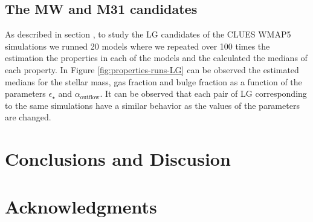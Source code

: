 \documentclass[usenatbib]{mn2e}
\begin{document}
\subsection{The MW and M31 candidates}
As described in section \label{sec:modeling-lg}, to study the LG candidates of the CLUES WMAP5 simulations we runned 20 models where we repeated over 100 times 
the estimation the properties in each of the models and the calculated the medians of each property. In Figure \ref{fig:properties-runs-LG} can be observed
the estimated medians for the stellar mass, gas fraction and bulge fraction as a function of the parameters $\epsilon_{\star}$ and $\alpha_{\text{outflow}}$.
It can be observed that each pair of LG corresponding to the same simulations have a similar behavior as the values of the parameters are changed.

\section{Conclusions and Discusion}
\label{sec:conclusions}

\section*{Acknowledgments}  


 
\end{document}
